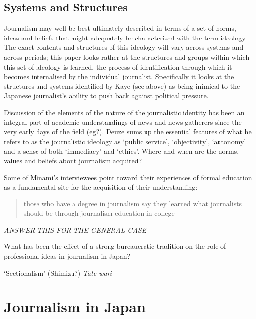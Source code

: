 \documentclass[11pt, headings=normal]{scrartcl}
\begin{document}
\hypertarget{systems-and-structures}{%
\subsection{Systems and Structures}\label{systems-and-structures}}

Journalism may well be best ultimately described in terms of a set of
norms, ideas and beliefs that might adequately be characterised with the
term ideology \autocite[for example, see][]{Deuze:2005}. The exact
contents and structures of this ideology will vary across systems and
across periods; this paper looks rather at the structures and groups
within which this set of ideology is learned, the process of
identification through which it becomes internalised by the individual
journalist. Specifically it looks at the structures and systems
identified by Kaye (see above) as being inimical to the Japanese
journalist's ability to push back against political pressure.

Discussion of the elements of the nature of the journalistic identity
has been an integral part of academic understandings of news and
news-gatherers since the very early days of the field (eg?).
Deuze\autocite*{Deuze:2005} sums up the essential features of what he
refers to as the journalistic ideology as `public service',
`objectivity', `autonomy' and a sense of both `immediacy' and
`ethics'\autocite[p447]{Deuze:2005}. Where and when are the norms,
values and beliefs about journalism acquired?

Some of Minami's interviewees point toward their experiences of formal
education as a fundamental site for the acquisition of their
understanding:

\begin{quote}
those who have a degree in journalism say they learned what journalists
should be through journalism education in college
\autocite[214]{Minami:2011}
\end{quote}

\emph{ANSWER THIS FOR THE GENERAL CASE}

What has been the effect of a strong bureaucratic tradition on the role
of professional ideas in journalism in Japan?

`Sectionalism' (Shimizu?) \emph{Tate-wari}

\hypertarget{journalism-in-japan}{%
\section{Journalism in Japan}\label{journalism-in-japan}}
\end{document}
